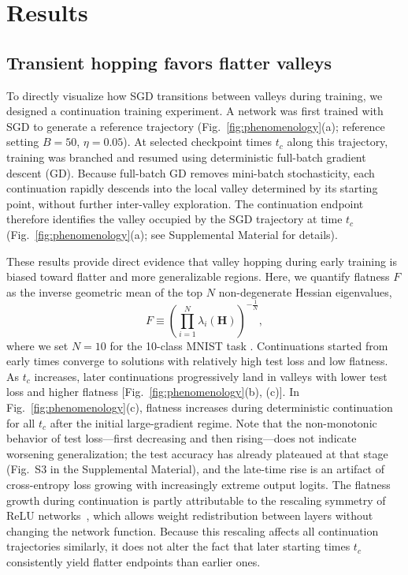 \documentclass[aps,prx,reprint,superscriptaddress,longbibliography,nofootinbib,floatfix]{revtex4-2}
\begin{document}
\section{Results}

\subsection{Transient hopping favors flatter valleys} 


To directly visualize how SGD transitions between valleys during training, we designed a continuation training experiment. A network was first trained with SGD to generate a reference trajectory (Fig.~\ref{fig:phenomenology}(a); reference setting $B = 50$, $\eta = 0.05$). At selected checkpoint times $t_c$ along this trajectory, training was branched and resumed using deterministic full-batch gradient descent (GD). Because full-batch GD removes mini-batch stochasticity, each continuation rapidly descends into the local valley determined by its starting point, without further inter-valley exploration. The continuation endpoint therefore identifies the valley occupied by the SGD trajectory at time $t_c$ (Fig.~\ref{fig:phenomenology}(a); see Supplemental Material for details).

These results provide direct evidence that valley hopping during early training is biased toward flatter and more generalizable regions. Here, we quantify flatness $F$ as the inverse geometric mean of the top $N$ non-degenerate Hessian eigenvalues,
\begin{equation}
F \equiv \left( \prod_{i=1}^{N} \lambda_i(\mathbf{H}) \right)^{-\tfrac{1}{N}},
\label{eq}
\end{equation}
where we set $N=10$ for the 10-class MNIST task \cite{sagunEmpiricalAnalysisHessian2018a}. Continuations started from early times converge to solutions with relatively high test loss and low flatness. As $t_c$ increases, later continuations progressively land in valleys with lower test loss and higher flatness [Fig.~\ref{fig:phenomenology}(b), (c)]. In Fig.~\ref{fig:phenomenology}(c), flatness increases during deterministic continuation for all $t_c$ after the initial large-gradient regime. Note that the non-monotonic behavior of test loss---first decreasing and then rising---does not indicate worsening generalization; the test accuracy has already plateaued at that stage (Fig.~S3 in the Supplemental Material), and the late-time rise is an artifact of cross-entropy loss growing with increasingly extreme output logits. The flatness growth during continuation is partly attributable to the rescaling symmetry of ReLU networks~\cite{fengActivityWeightDuality2023}, which allows weight redistribution between layers without changing the network function. Because this rescaling affects all continuation trajectories similarly, it does not alter the fact that later starting times $t_c$ consistently yield flatter endpoints than earlier ones.
\end{document}
